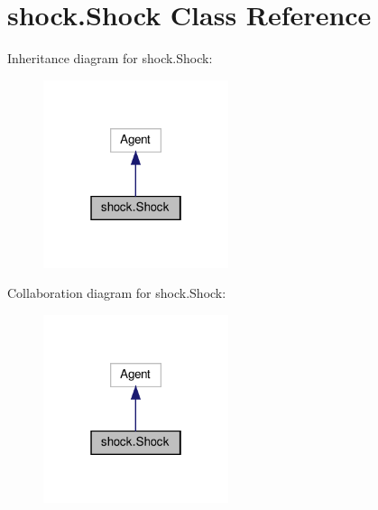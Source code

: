 \hypertarget{classshock_1_1Shock}{}\section{shock.\+Shock Class Reference}
\label{classshock_1_1Shock}


Inheritance diagram for shock.\+Shock\+:\nopagebreak
\begin{figure}[H]
\begin{center}
\leavevmode
\includegraphics[width=154pt]{classshock_1_1Shock__inherit__graph}
\end{center}
\end{figure}


Collaboration diagram for shock.\+Shock\+:\nopagebreak
\begin{figure}[H]
\begin{center}
\leavevmode
\includegraphics[width=154pt]{classshock_1_1Shock__coll__graph}
\end{center}
\end{figure}
